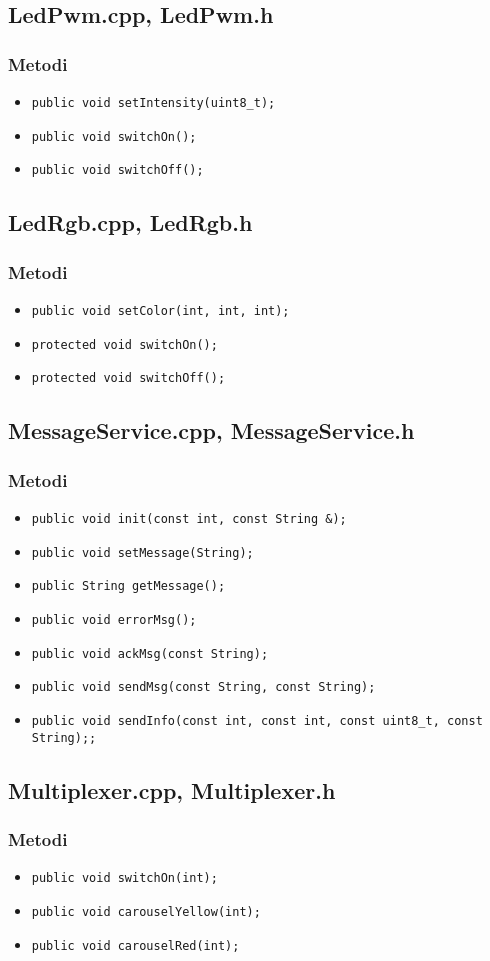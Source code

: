 \subsection{LedPwm.cpp, LedPwm.h}
\subsubsection{Metodi}
\begin{itemize}
	\item \texttt{public void setIntensity(uint8\_t);}
	\item \texttt{public void switchOn();}
	\item \texttt{public void switchOff();}
\end{itemize}

\subsection{LedRgb.cpp, LedRgb.h}
\subsubsection{Metodi}
\begin{itemize}
	\item \texttt{public void setColor(int, int, int);}
	\item \texttt{protected	void switchOn();}
	\item \texttt{protected	void switchOff();}
\end{itemize}

\subsection{MessageService.cpp, MessageService.h}
\subsubsection{Metodi}
\begin{itemize}
	\item \texttt{public void init(const int, const String \&);}
	\item \texttt{public void setMessage(String);}
	\item \texttt{public String getMessage();}
	\item \texttt{public void errorMsg();}
	\item \texttt{public void ackMsg(const String);}
	\item \texttt{public void sendMsg(const String, const String);}
	\item \texttt{public void sendInfo(const int, const int, const uint8\_t, const String);;}
\end{itemize}

\subsection{Multiplexer.cpp, Multiplexer.h}
\subsubsection{Metodi}
\begin{itemize}
	\item \texttt{public void switchOn(int);}
	\item \texttt{public void carouselYellow(int);}
	\item \texttt{public void carouselRed(int);}
\end{itemize}
